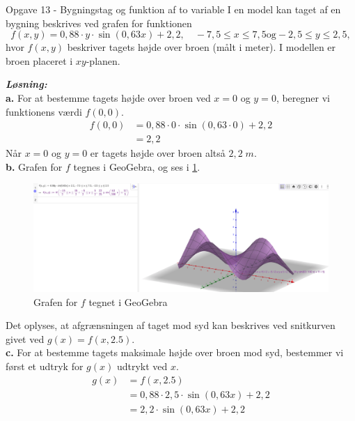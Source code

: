 \documentclass{article}
\newcommand{\sol}{\setlength{\parindent}{0cm}\textbf{\textit{Løsning:}}\setlength{\parindent}{1cm}}
\begin{document}
\begin{question}{Opgave 13 - Bygningstag og funktion af to variable}{}
  I en model kan taget af en bygning beskrives ved grafen for funktionen
$$f(x,y)=0,88\cdot y\cdot\sin(0,63x)+2,2,\quad-7,5\leq x\leq7,5\text{og}-2,5\leq y\leq2,5,$$
hvor $f(x,y)$ beskriver tagets højde over broen (målt i meter).
I modellen er broen placeret i $xy$-planen.
\end{question}
\sol \\
\textbf{a.}
For at bestemme tagets højde over broen ved $x=0$ og $y=0$, beregner vi funktionens værdi $f(0,0)$. 
\begin{equation*}
\begin{split}
  f(0,0)&= 0,88 \cdot 0 \cdot \sin\left(0,63 \cdot 0\right) +2,2 \\
  &=2,2
\end{split}
\end{equation*}
Når $x=0$ og $y=0$ er tagets højde over broen altså $2,2 \;\unit{m} $. \\[1ex]
\textbf{b.} 
Grafen for $f$ tegnes i GeoGebra, og ses i \cref{fig:tag}. 
\begin{figure}[H]
\begin{center}
  \includegraphics[width=\textwidth]{tag.png}
\end{center}
\caption{Grafen for $f$ tegnet i GeoGebra}
\label{fig:tag}
\end{figure}
\noindent Det oplyses, at afgrænsningen af taget mod syd kan beskrives ved snitkurven givet ved $g(x) =f(x,2.5)$. \\[1ex]
\textbf{c.}
For at bestemme tagets maksimale højde over broen mod syd, bestemmer vi først et udtryk for $g(x)$ udtrykt ved $x$. 
\begin{equation*}
\begin{split}
  g(x)&= f(x,2.5)\\
  &=0,88 \cdot 2,5 \cdot \sin\left(0,63x\right) +2,2\\
  &=2,2 \cdot \sin\left(0,63x\right) +2,2
\end{split}
\end{equation*}
\end{document}
